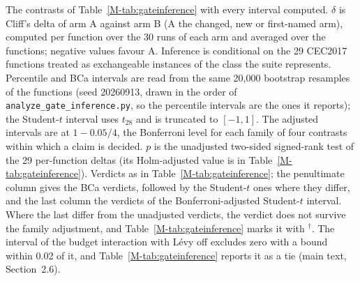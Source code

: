 \begin{table}[htbp]
\begin{flushleft}
The contrasts of Table~\ref{M-tab:gateinference} with every interval computed. $\delta$ is Cliff's delta of arm A against arm B (A the changed, new or first-named arm), computed per function over the 30 runs of each arm and averaged over the functions; negative values favour A. Inference is conditional on the 29 CEC2017 functions treated as exchangeable instances of the class the suite represents. Percentile and BCa intervals are read from the same 20{,}000 bootstrap resamples of the functions (seed 20260913, drawn in the order of \texttt{analyze\_gate\_inference.py}, so the percentile intervals are the ones it reports); the Student-$t$ interval uses $t_{28}$ and is truncated to $[-1,1]$. The adjusted intervals are at $1-0.05/4$, the Bonferroni level for each family of four contrasts within which a claim is decided. $p$ is the unadjusted two-sided signed-rank test of the 29 per-function deltas (its Holm-adjusted value is in Table~\ref{M-tab:gateinference}). Verdicts as in Table~\ref{M-tab:gateinference}; the penultimate column gives the BCa verdicts, followed by the Student-$t$ ones where they differ, and the last column the verdicts of the Bonferroni-adjusted Student-$t$ interval. Where the last differ from the unadjusted verdicts, the verdict does not survive the family adjustment, and Table~\ref{M-tab:gateinference} marks it with $^{\dagger}$. The interval of the budget interaction with L\'evy off excludes zero with a bound within 0.02 of it, and Table~\ref{M-tab:gateinference} reports it as a tie (main text, Section~2.6).
\end{flushleft}
\end{table}

